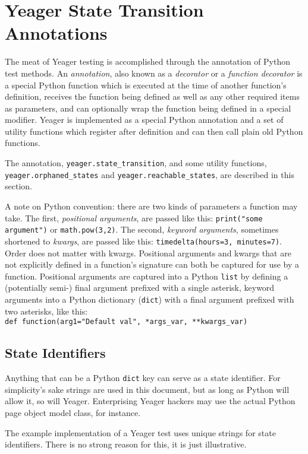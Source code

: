 \section{Yeager State Transition Annotations}
The meat of Yeager testing is accomplished through the annotation of Python test methods. An \textit{annotation}, also known as a \textit{decorator} or a \textit{function decorator} is a special Python function which is executed at the time of another function's definition, receives the function being defined as well as any other required items as parameters, and can optionally wrap the function being defined in a special modifier. Yeager is implemented as a special Python annotation and a set of utility functions which register after definition and can then call plain old Python functions.

The annotation, \texttt{yeager.state\_transition}, and some utility functions, \\\texttt{yeager.orphaned\_states} and \texttt{yeager.reachable\_states}, are described in this section.

A note on Python convention: there are two kinds of parameters a function may take. The first, \textit{positional arguments}, are passed like this: \texttt{print("some argument")} or \texttt{math.pow(3,2)}. The second, \textit{keyword arguments}, sometimes shortened to \textit{kwargs}, are passed like this:
\texttt{timedelta(hours=3, minutes=7)}. Order does not matter with kwargs. Positional arguments and kwargs that are not explicitly defined in a function's signature can both be captured for use by a function. Positional arguments are captured into a Python \texttt{list} by defining a (potentially semi-) final argument prefixed with a single asterisk, keyword arguments into a Python dictionary (\texttt{dict}) with a final argument prefixed with two asterisks, like this:
\\\texttt{def function(arg1="Default val", *args\_var, **kwargs\_var)}

\subsection{State Identifiers}
Anything that can be a Python \texttt{dict} key can serve as a state identifier. For simplicity's sake strings are used in this document, but as long as Python will allow it, so will Yeager. Enterprising Yeager hackers may use the actual Python page object model class, for instance.

The example implementation of a Yeager test uses unique strings for state identifiers. There is no strong reason for this, it is just illustrative.

